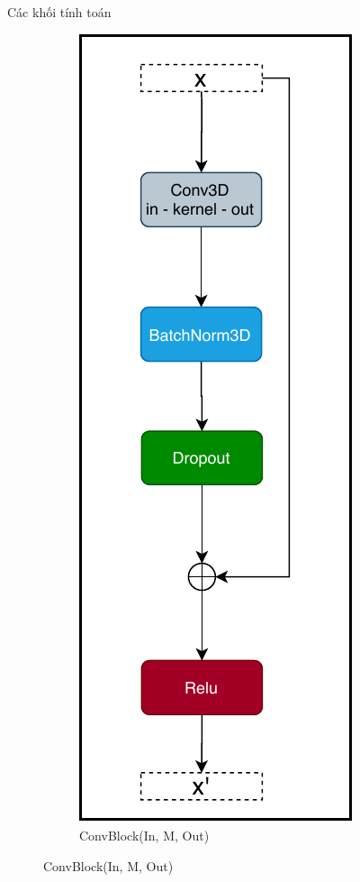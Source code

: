 \documentclass[
	10pt,                %
	aspectratio=169,     %
]{beamer}
\begin{document}
\begin{frame}{Các khối tính toán}
\begin{figure}[h!]
\begin{subfigure}[b]{0.4\textwidth}
			    \centering	\includegraphics[scale=0.45]{figures/arch/convblock.pdf}
				\caption{ConvBlock(In, M, Out)}
			\end{subfigure}
			\vspace{-3mm}
		\end{figure}
    \end{frame}%
    
\end{document}
